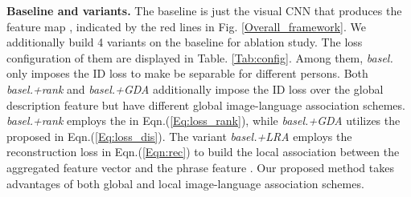 \documentclass[runningheads]{llncs}
\begin{document}
\noindent\textbf{Baseline and variants.} The baseline is just the visual CNN that produces the feature map , indicated by the red lines in Fig. \ref{Overall_framework}.  We additionally build 4 variants on the baseline for ablation study. The loss configuration of them are displayed in Table. \ref{Tab:config}. Among them, \emph{basel.} only imposes the ID loss to make  be separable for different persons. Both \emph{basel.+rank} and \emph{basel.+GDA} additionally impose the ID loss over the global description feature  but have different global image-language association schemes. \emph{basel.+rank} employs the  in Eqn.(\ref{Eq:loss_rank}), while \emph{basel.+GDA} utilizes the proposed  in Eqn.(\ref{Eq:loss_dis}). The variant \emph{basel.+LRA}
employs the reconstruction loss  in Eqn.(\ref{Eqn:rec}) to build the local association between the aggregated feature vector  and the phrase feature . Our proposed method takes advantages of both global and local image-language association schemes.
 
\end{document}
